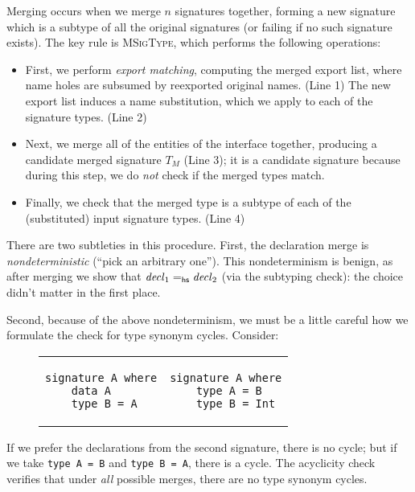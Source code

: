 Merging occurs when we merge $n$ signatures together, forming a new
signature which is a subtype of all the original signatures (or failing
if no such signature exists).  The key rule is \textsc{MSigType}, which performs
the following operations:

\begin{itemize}
    \item First, we perform \emph{export matching}, computing the merged
    export list, where name holes are subsumed by reexported original
    names. (Line 1) The new export list induces a name substitution, which we apply
    to each of the signature types. (Line 2)

    \item Next, we merge all of the entities of the interface together,
    producing a candidate merged signature $T_M$ (Line 3); it is a candidate signature
    because during this step, we do \emph{not} check if the merged types match.

    \item Finally, we check that the merged type is a subtype of each of the
    (substituted) input signature types. (Line 4)
\end{itemize}

There are two subtleties in this procedure.  First, the declaration
merge is \emph{nondeterministic} (``pick an arbitrary one'').  This
nondeterminism is benign, as after merging we show that $\mathit{decl}_1
=_\textsf{hs} \mathit{decl}_2$ (via the subtyping check): the choice didn't
matter in the first place.

Second, because of the above nondeterminism, we must be a little careful
how we formulate the check for type synonym cycles.  Consider:

\vspace{-1em}
\begin{figure}[H]
\centering
\begin{shortmath}
\begin{tabular}{p{} p{}}
\begin{lstlisting}
signature A where
    data A
    type B = A
\end{lstlisting}
&
\begin{lstlisting}
signature A where
    type A = B
    type B = Int
\end{lstlisting}
\end{tabular}
\end{shortmath}
\end{figure}

\vspace{-2em}
\noindent
If we prefer the declarations from the second signature, there is no cycle;
but if we take \verb|type A = B| and \verb|type B = A|, there is a cycle.
The acyclicity check verifies that under \emph{all} possible merges, there
are no type synonym cycles.

